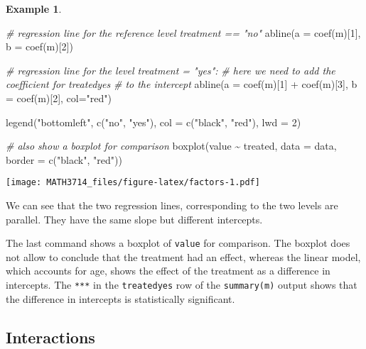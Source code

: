 \documentclass[
  a4paper,
]{article}
\newenvironment{Shaded}{\begin{snugshade}}{\end{snugshade}}
\newcommand{\AttributeTok}[1]{\textcolor[rgb]{0.77,0.63,0.00}{#1}}
\newcommand{\CommentTok}[1]{\textcolor[rgb]{0.56,0.35,0.01}{\textit{#1}}}
\newcommand{\DecValTok}[1]{\textcolor[rgb]{0.00,0.00,0.81}{#1}}
\newcommand{\FunctionTok}[1]{\textcolor[rgb]{0.00,0.00,0.00}{#1}}
\newcommand{\NormalTok}[1]{#1}
\newcommand{\SpecialCharTok}[1]{\textcolor[rgb]{0.00,0.00,0.00}{#1}}
\newcommand{\StringTok}[1]{\textcolor[rgb]{0.31,0.60,0.02}{#1}}
\theoremstyle{definition}
\theoremstyle{definition}
\newtheorem{example}{Example}[section]
\theoremstyle{definition}
\theoremstyle{definition}
\theoremstyle{remark}
\begin{document}
\begin{example}
\begin{Shaded}
\begin{Highlighting}[]
\CommentTok{\# regression line for the reference level \textasciigrave{}treatment == "no"\textasciigrave{}}
\FunctionTok{abline}\NormalTok{(}\AttributeTok{a =} \FunctionTok{coef}\NormalTok{(m)[}\DecValTok{1}\NormalTok{], }\AttributeTok{b =} \FunctionTok{coef}\NormalTok{(m)[}\DecValTok{2}\NormalTok{])}

\CommentTok{\# regression line for the level \textasciigrave{}treatment = "yes"\textasciigrave{}:}
\CommentTok{\# here we need to add the coefficient for \textasciigrave{}treatedyes\textasciigrave{}}
\CommentTok{\# to the intercept}
\FunctionTok{abline}\NormalTok{(}\AttributeTok{a =} \FunctionTok{coef}\NormalTok{(m)[}\DecValTok{1}\NormalTok{] }\SpecialCharTok{+} \FunctionTok{coef}\NormalTok{(m)[}\DecValTok{3}\NormalTok{], }\AttributeTok{b =} \FunctionTok{coef}\NormalTok{(m)[}\DecValTok{2}\NormalTok{], }\AttributeTok{col=}\StringTok{"red"}\NormalTok{)}

\FunctionTok{legend}\NormalTok{(}\StringTok{"bottomleft"}\NormalTok{, }\FunctionTok{c}\NormalTok{(}\StringTok{"no"}\NormalTok{, }\StringTok{"yes"}\NormalTok{),}
       \AttributeTok{col =} \FunctionTok{c}\NormalTok{(}\StringTok{"black"}\NormalTok{, }\StringTok{"red"}\NormalTok{), }\AttributeTok{lwd =} \DecValTok{2}\NormalTok{)}

\CommentTok{\# also show a boxplot for comparison}
\FunctionTok{boxplot}\NormalTok{(value }\SpecialCharTok{\textasciitilde{}}\NormalTok{ treated, }\AttributeTok{data =}\NormalTok{ data,}
        \AttributeTok{border =} \FunctionTok{c}\NormalTok{(}\StringTok{"black"}\NormalTok{, }\StringTok{"red"}\NormalTok{))}
\end{Highlighting}
\end{Shaded}

\texttt{[image: MATH3714\_files/figure-latex/factors-1.pdf]}

We can see that the two regression lines, corresponding to the two levels
are parallel. They have the same slope but different intercepts.

The last command shows a boxplot of \texttt{value} for comparison.
The boxplot does not allow to conclude that the treatment had an effect,
whereas the linear model, which accounts for age, shows the effect
of the treatment as a difference in intercepts. The \texttt{***}
in the \texttt{treatedyes} row of the \texttt{summary(m)} output shows that the
difference in intercepts is statistically significant.
\end{example}

\hypertarget{interactions}{%
\subsection{Interactions}\label{interactions}}
\end{document}
